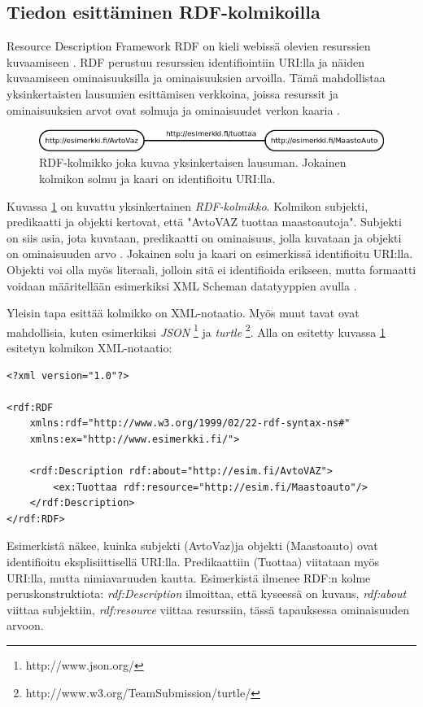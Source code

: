 \documentclass[finnish]{tktltiki2}
\theoremstyle{definition}
\theoremstyle{remark}
\begin{document}
\subsection{Tiedon esittäminen RDF-kolmikoilla}

Resource Description Framework RDF on kieli webissä olevien resurssien
kuvaamiseen \cite{RDFP}. 
RDF perustuu resurssien identifiointiin URI:lla ja näiden kuvaamiseen 
ominaisuuksilla ja ominaisuuksien arvoilla. Tämä mahdollistaa yksinkertaisten
lausumien esittämisen verkkoina, joissa resurssit ja ominaisuuksien arvot ovat solmuja ja
ominaisuudet verkon 
kaaria \cite{RDFP}. %

\begin{figure}[h]
 \centering
 \includegraphics[scale=0.50]{JackTorrance.png}
 \caption{RDF-kolmikko joka kuvaa yksinkertaisen lausuman. Jokainen kolmikon solmu
ja kaari on identifioitu URI:lla. }
 \label{jack}
\end{figure}

Kuvassa \ref{jack} on kuvattu yksinkertainen \textit{RDF-kolmikko}.
Kolmikon subjekti, predikaatti ja objekti kertovat, että "AvtoVAZ tuottaa maastoautoja". Subjekti on siis asia, jota kuvataan, predikaatti on ominaisuus, jolla 
kuvataan ja objekti on ominaisuuden arvo \cite{RDFP}. 
Jokainen solu ja kaari on esimerkissä identifioitu URI:lla. Objekti voi olla
myös literaali, jolloin 
sitä ei identifioida erikseen, mutta formaatti voidaan määritellään esimerkiksi XML Scheman
datatyyppien avulla \cite{RDFP}. 

Yleisin tapa esittää kolmikko on XML-notaatio. Myös muut tavat ovat mahdollisia,
kuten 
esimerkiksi \textit{JSON} \footnote{http://www.json.org/} ja \textit{turtle} \footnote{http://www.w3.org/TeamSubmission/turtle/}. Alla on esitetty kuvassa
\ref{jack} esitetyn kolmikon XML-notaatio:
\begin{verbatim}
<?xml version="1.0"?>

<rdf:RDF
    xmlns:rdf="http://www.w3.org/1999/02/22-rdf-syntax-ns#"
    xmlns:ex="http://www.esimerkki.fi/">
    
    <rdf:Description rdf:about="http://esim.fi/AvtoVAZ">
        <ex:Tuottaa rdf:resource="http://esim.fi/Maastoauto"/>
    </rdf:Description>
</rdf:RDF>
\end{verbatim}
Esimerkistä näkee, kuinka subjekti (AvtoVaz)ja objekti (Maastoauto) ovat
identifioitu eksplisiittisellä URI:lla. Predikaattiin (Tuottaa) viitataan myös URI:lla, mutta
nimiavaruuden kautta. Esimerkistä ilmenee RDF:n kolme peruskonstruktiota:  
\textit{rdf:Description} ilmoittaa, että kyseessä on kuvaus, \textit{rdf:about} viittaa subjektiin, \textit{rdf:resource}
viittaa resurssiin, tässä tapauksessa ominaisuuden arvoon. 
\end{document}
